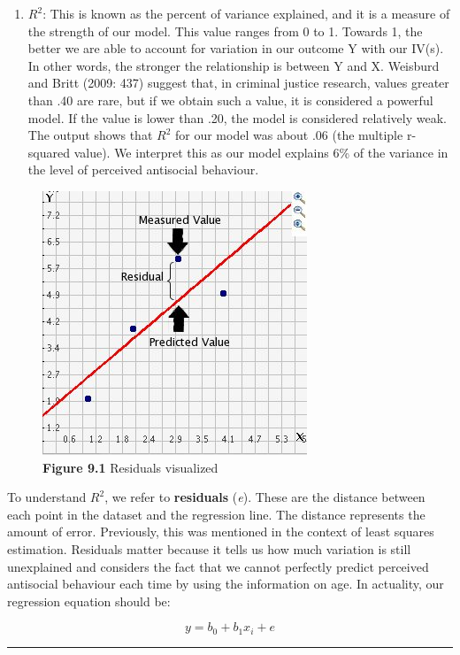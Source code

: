 \documentclass[
]{book}
\begin{document}
\begin{enumerate}
\item
  \(R^2\): This is known as the percent of variance explained, and it is a measure of the strength of our model. This value ranges from 0 to 1. Towards 1, the better we are able to account for variation in our outcome Y with our IV(s). In other words, the stronger the relationship is between Y and X. Weisburd and Britt (2009: 437) suggest that, in criminal justice research, values greater than .40 are rare, but if we obtain such a value, it is considered a powerful model. If the value is lower than .20, the model is considered relatively weak. The output shows that \(R^2\) for our model was about .06 (the multiple r-squared value). We interpret this as our model explains 6\% of the variance in the level of perceived antisocial behaviour.
\end{enumerate}

\begin{figure}
\centering
\includegraphics{Images/residual.jpg}
\caption{\textbf{Figure 9.1} Residuals visualized}
\end{figure}

To understand \(R^2\), we refer to \textbf{residuals} (\emph{e}). These are the distance between each point in the dataset and the regression line. The distance represents the amount of error. Previously, this was mentioned in the context of least squares estimation. Residuals matter because it tells us how much variation is still unexplained and considers the fact that we cannot perfectly predict perceived antisocial behaviour each time by using the information on age. In actuality, our regression equation should be:

\[y = b_0 + b_1x_i + e\]

\begin{center}\rule{0.5\linewidth}{0.5pt}\end{center}
\end{document}

